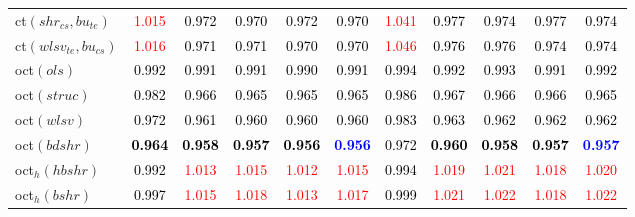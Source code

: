 \begin{tabular}[t]{l|>{}cccc>{}c|ccccc}
ct$(shr_{cs}, bu_{te})$ & \textcolor{red}{1.015} & \textcolor{black}{0.972} & \textcolor{black}{0.970} & \textcolor{black}{0.972} & \textcolor{black}{0.970} & \textcolor{red}{1.041} & \textcolor{black}{0.977} & \textcolor{black}{0.974} & \textcolor{black}{0.977} & \textcolor{black}{0.974}\\
ct$(wlsv_{te}, bu_{cs})$ & \textcolor{red}{1.016} & \textcolor{black}{0.971} & \textcolor{black}{0.971} & \textcolor{black}{0.970} & \textcolor{black}{0.970} & \textcolor{red}{1.046} & \textcolor{black}{0.976} & \textcolor{black}{0.976} & \textcolor{black}{0.974} & \textcolor{black}{0.974}\\
oct$(ols)$ & \textcolor{black}{0.992} & \textcolor{black}{0.991} & \textcolor{black}{0.991} & \textcolor{black}{0.990} & \textcolor{black}{0.991} & \textcolor{black}{0.994} & \textcolor{black}{0.992} & \textcolor{black}{0.993} & \textcolor{black}{0.991} & \textcolor{black}{0.992}\\
oct$(struc)$ & \textcolor{black}{0.982} & \textcolor{black}{0.966} & \textcolor{black}{0.965} & \textcolor{black}{0.965} & \textcolor{black}{0.965} & \textcolor{black}{0.986} & \textcolor{black}{0.967} & \textcolor{black}{0.966} & \textcolor{black}{0.966} & \textcolor{black}{0.965}\\
oct$(wlsv)$ & \textcolor{black}{0.972} & \textcolor{black}{0.961} & \textcolor{black}{0.960} & \textcolor{black}{0.960} & \textcolor{black}{0.960} & \textcolor{black}{0.983} & \textcolor{black}{0.963} & \textcolor{black}{0.962} & \textcolor{black}{0.962} & \textcolor{black}{0.962}\\
oct$(bdshr)$ & \textcolor{black}{\textbf{0.964}} & \textcolor{black}{\textbf{0.958}} & \textcolor{black}{\textbf{0.957}} & \textcolor{black}{\textbf{0.956}} & \textcolor{blue}{\textbf{0.956}} & \textcolor{black}{0.972} & \textcolor{black}{\textbf{0.960}} & \textcolor{black}{\textbf{0.958}} & \textcolor{black}{\textbf{0.957}} & \textcolor{blue}{\textbf{0.957}}\\
oct$_h(hbshr)$ & \textcolor{black}{0.992} & \textcolor{red}{1.013} & \textcolor{red}{1.015} & \textcolor{red}{1.012} & \textcolor{red}{1.015} & \textcolor{black}{0.994} & \textcolor{red}{1.019} & \textcolor{red}{1.021} & \textcolor{red}{1.018} & \textcolor{red}{1.020}\\
oct$_h(bshr)$ & \textcolor{black}{0.997} & \textcolor{red}{1.015} & \textcolor{red}{1.018} & \textcolor{red}{1.013} & \textcolor{red}{1.017} & \textcolor{black}{0.999} & \textcolor{red}{1.021} & \textcolor{red}{1.022} & \textcolor{red}{1.018} & \textcolor{red}{1.022}\\

\end{tabular}
